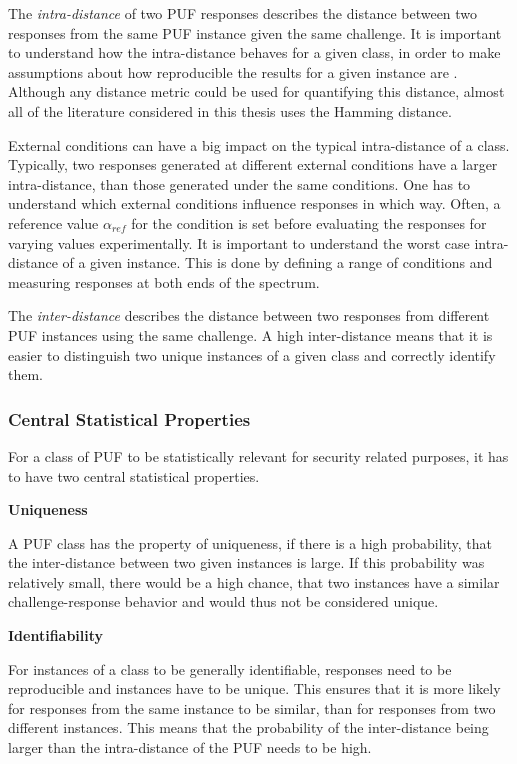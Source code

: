 The \emph{intra-distance} of two PUF responses describes the distance between two responses from the same PUF
instance given the same challenge. It is important to understand how the intra-distance behaves for a given class,
in order to make assumptions about how reproducible the results for a given instance are \cite[][p. 16f]{Maes2013}.
Although any distance metric could be used for quantifying this distance, almost all of the literature considered
in this thesis uses the Hamming distance.

External conditions can have a big impact on the typical intra-distance of a class.
Typically, two responses generated at different external conditions have a larger intra-distance,
than those generated under the same conditions.
One has to understand which external conditions influence responses in which way.
Often, a reference value $\alpha_{ref}$ for the condition is set before evaluating the responses for
varying values experimentally.
It is important to understand the worst case intra-distance of a given instance.
This is done by defining a range of conditions and measuring responses at both ends of the spectrum.
\cite[][p. 16f]{Maes2013}


The \emph{inter-distance} describes the distance between two responses from different PUF instances
using the same challenge.
A high inter-distance means that it is easier to distinguish two unique instances of a given class
and correctly identify them. \cite[][p. 18ff]{Maes2013}

\subsubsection{Central Statistical Properties}
\label{sec:central_statistical_properties}

For a class of PUF to be statistically relevant for security related purposes, it has to have two central
statistical properties.

\textbf{Uniqueness}

A PUF class has the property of uniqueness, if there is a high probability, that the inter-distance between two given instances
is large. If this probability was relatively small, there would be a high chance, that two instances have a similar
challenge-response behavior and would thus not be considered unique. \cite[][p. 53]{Maes2013}

\textbf{Identifiability}

For instances of a class to be generally identifiable, responses need to be reproducible and instances have
to be unique. This ensures that it is more likely for responses from the same instance to be similar,
than for responses from two different instances.
This means that the probability of the inter-distance being larger
than the intra-distance of the PUF needs to be high. \cite[][p. 53f]{Maes2013}

